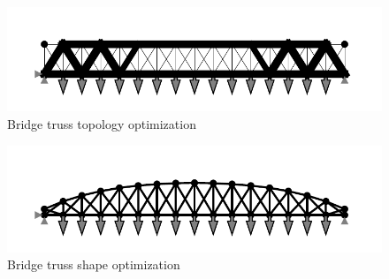\begin{figure}[!ht]
    \centering
    \includegraphics[width=\textwidth]{figures/bridge_topology_optimized.pdf}
    \caption{Bridge truss topology optimization}
    \label{fig:bridge_topology}
\end{figure}

\begin{figure}[!ht]
    \centering
    \includegraphics[width=\textwidth]{figures/bridge_shape_optimized.pdf}
    \caption{Bridge truss shape optimization}
    \label{fig:bridge_shape}
\end{figure}





 